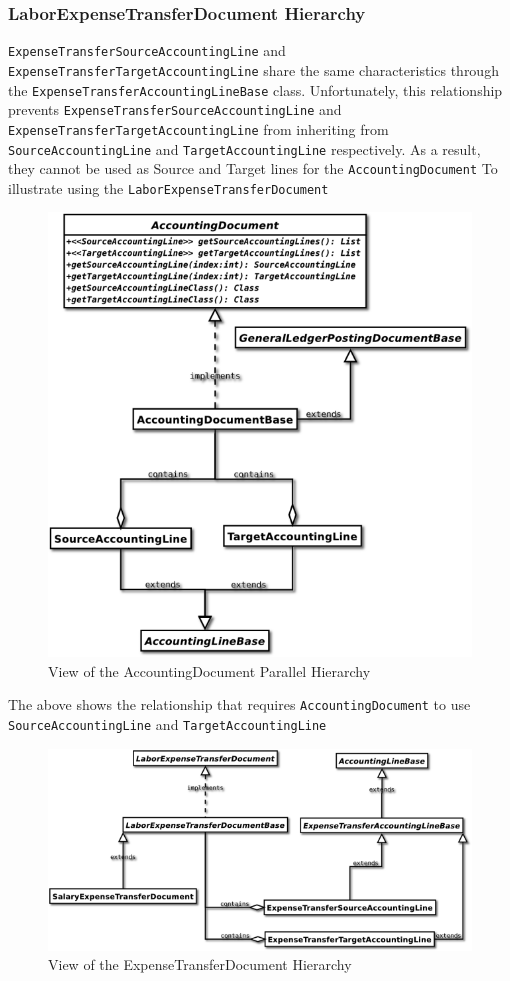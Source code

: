 \documentclass[12pt,notitlepage]{article}
\begin{document}
  \subsubsection{LaborExpenseTransferDocument Hierarchy}
  \verb|ExpenseTransferSourceAccountingLine| and \verb|ExpenseTransferTargetAccountingLine| share the same 
  characteristics through the \verb|ExpenseTransferAccountingLineBase| class. Unfortunately, this relationship
  prevents \verb|ExpenseTransferSourceAccountingLine| and \verb|ExpenseTransferTargetAccountingLine| from 
  inheriting from \verb|SourceAccountingLine| and \verb|TargetAccountingLine| respectively. As a result, they 
  cannot be used as Source and Target lines for the \verb|AccountingDocument|
  \newpage
  To illustrate using the \verb|LaborExpenseTransferDocument|
  \begin{figure}[!h]
    \caption{View of the AccountingDocument Parallel Hierarchy}
    \includegraphics[bb=10 300 300 640]{../Diagrams/AccountingDocumentParallelHierachy_class.png}
  \end{figure}
  The above shows the relationship that requires \verb|AccountingDocument| to use \verb|SourceAccountingLine|
  and \verb|TargetAccountingLine|
  \begin{figure}[!h]
    \caption{View of the ExpenseTransferDocument Hierarchy}
    \includegraphics[bb=25 250 400 450]{../Diagrams/ExpenseTransferDocumentHierarchy_class.png}
  \end{figure}
\end{document}
